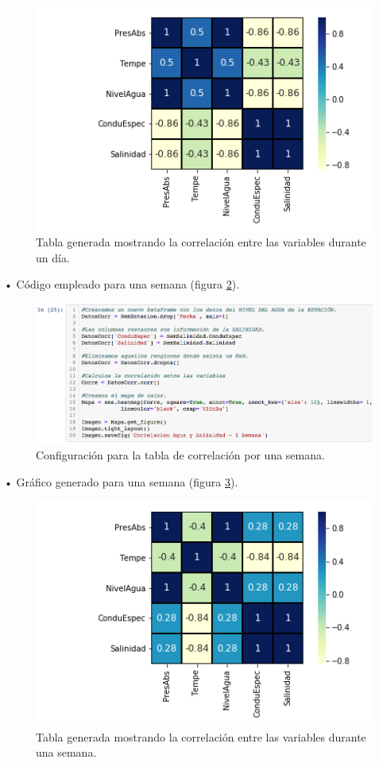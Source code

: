 \documentclass[12pt]{article}
\begin{document}
\begin{figure}[h!]
	\center
	\includegraphics[scale=.6]{Correlacion-Agua-y-Salinidad-Dia}
	\caption{\label{fig:graf-corre-dia} Tabla generada mostrando la correlación entre las variables durante un día.}
\end{figure}

\noindent • Código empleado para una semana (figura \ref{fig:cod-corre-sem}). \\

\begin{figure}[h!]
	\center
	\includegraphics[scale=.55]{./Images/corre-sem}
	\caption{\label{fig:cod-corre-sem} Configuración para la tabla de correlación por una semana.}
\end{figure}

\noindent • Gráfico generado para una semana (figura \ref{fig:graf-corre-sem}).

\begin{figure}[h!]
	\center
	\includegraphics[scale=.6]{Correlacion-Agua-y-Salinidad-Semana}
	\caption{\label{fig:graf-corre-sem} Tabla generada mostrando la correlación entre las variables durante una semana.}
\end{figure}
\end{document}
